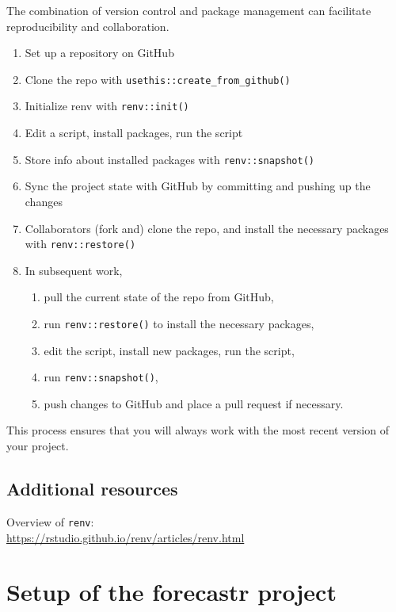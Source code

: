 \documentclass[
  letterpaper,
  DIV=11,
  numbers=noendperiod]{scrreport}
\begin{document}
The combination of version control and package management can facilitate
reproducibility and collaboration.

\begin{enumerate}
\def\labelenumi{\arabic{enumi}.}
\item
  Set up a repository on GitHub
\item
  Clone the repo with \texttt{usethis::create\_from\_github()}
\item
  Initialize renv with \texttt{renv::init()}
\item
  Edit a script, install packages, run the script
\item
  Store info about installed packages with \texttt{renv::snapshot()}
\item
  Sync the project state with GitHub by committing and pushing up the
  changes
\item
  Collaborators (fork and) clone the repo, and install the necessary
  packages with \texttt{renv::restore()}
\item
  In subsequent work,

  \begin{enumerate}
  \def\labelenumii{\alph{enumii}.}
  \item
    pull the current state of the repo from GitHub,
  \item
    run \texttt{renv::restore()} to install the necessary packages,
  \item
    edit the script, install new packages, run the script,
  \item
    run \texttt{renv::snapshot()},
  \item
    push changes to GitHub and place a pull request if necessary.
  \end{enumerate}
\end{enumerate}

This process ensures that you will always work with the most recent
version of your project.

\section{Additional resources}\label{additional-resources-2}

Overview of \texttt{renv}:\\
\url{https://rstudio.github.io/renv/articles/renv.html}


\chapter{Setup of the forecastr project}\label{sec-setup}
\end{document}
